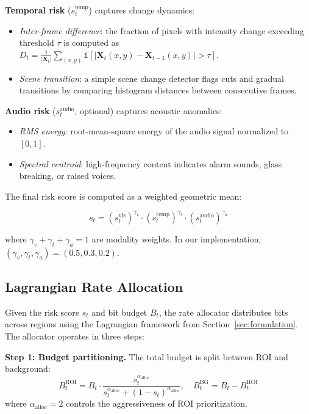 \textbf{Temporal risk} ($s_t^{\text{temp}}$) captures change dynamics:
\begin{itemize}
    \item \emph{Inter-frame difference}: the fraction of pixels with intensity change exceeding threshold $\tau$ is computed as $D_t = \frac{1}{|\mathbf{X}_t|} \sum_{(x,y)} \mathbb{1}[|\mathbf{X}_t(x,y) - \mathbf{X}_{t-1}(x,y)| > \tau]$.
    \item \emph{Scene transition}: a simple scene change detector flags cuts and gradual transitions by comparing histogram distances between consecutive frames.
\end{itemize}

\textbf{Audio risk} ($s_t^{\text{audio}}$, optional) captures acoustic anomalies:
\begin{itemize}
    \item \emph{RMS energy}: root-mean-square energy of the audio signal normalized to $[0, 1]$.
    \item \emph{Spectral centroid}: high-frequency content indicates alarm sounds, glass breaking, or raised voices.
\end{itemize}

The final risk score is computed as a weighted geometric mean:

\begin{equation}
\label{eq:risk}
s_t = \left( s_t^{\text{vis}} \right)^{\gamma_v} \cdot \left( s_t^{\text{temp}} \right)^{\gamma_t} \cdot \left( s_t^{\text{audio}} \right)^{\gamma_a}
\end{equation}

where $\gamma_v + \gamma_t + \gamma_a = 1$ are modality weights. In our implementation, $(\gamma_v, \gamma_t, \gamma_a) = (0.5, 0.3, 0.2)$.

\subsection{Lagrangian Rate Allocation}
\label{sec:rate_allocation}

Given the risk score $s_t$ and bit budget $B_t$, the rate allocator distributes bits across regions using the Lagrangian framework from Section~\ref{sec:formulation}. The allocator operates in three steps:

\textbf{Step 1: Budget partitioning.} The total budget is split between ROI and background:
\begin{equation}
B_t^{\text{ROI}} = B_t \cdot \frac{s_t^{\alpha_{\text{alloc}}}}{s_t^{\alpha_{\text{alloc}}} + (1-s_t)^{\alpha_{\text{alloc}}}}, \quad B_t^{\text{BG}} = B_t - B_t^{\text{ROI}}
\end{equation}
where $\alpha_{\text{alloc}} = 2$ controls the aggressiveness of ROI prioritization.

